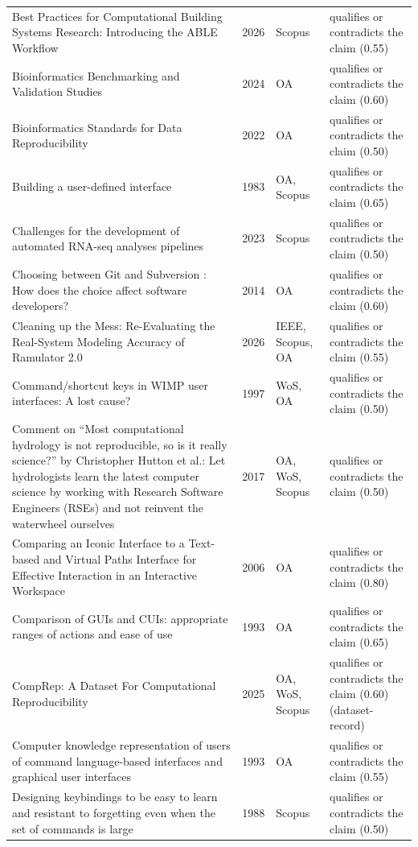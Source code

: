 \begin{longtable}{@{}%
  >{\raggedright\arraybackslash}p{}c%
  >{\raggedright\arraybackslash}p{}%
  >{\raggedright\arraybackslash}p{}@{}}
Best Practices for Computational Building Systems Research: Introducing the ABLE Workflow & 2026 & Scopus & qualifies or contradicts the claim (0.55) \\
Bioinformatics Benchmarking and Validation Studies & 2024 & OA & qualifies or contradicts the claim (0.60) \\
Bioinformatics Standards for Data Reproducibility & 2022 & OA & qualifies or contradicts the claim (0.50) \\
Building a user-defined interface & 1983 & OA, Scopus & qualifies or contradicts the claim (0.65) \\
Challenges for the development of automated RNA-seq analyses pipelines & 2023 & Scopus & qualifies or contradicts the claim (0.50) \\
Choosing between Git and Subversion : How does the choice affect software developers? & 2014 & OA & qualifies or contradicts the claim (0.60) \\
Cleaning up the Mess: Re-Evaluating the Real-System Modeling Accuracy of Ramulator 2.0 & 2026 & IEEE, Scopus, OA & qualifies or contradicts the claim (0.55) \\
Command/shortcut keys in WIMP user interfaces: A lost cause? & 1997 & WoS, OA & qualifies or contradicts the claim (0.50) \\
Comment on ``Most computational hydrology is not reproducible, so is it really science?'' by Christopher Hutton et al.: Let hydrologists learn the latest computer science by working with Research Software Engineers (RSEs) and not reinvent the waterwheel ourselves & 2017 & OA, WoS, Scopus & qualifies or contradicts the claim (0.50) \\
Comparing an Iconic Interface to a Text-based and Virtual Paths Interface for Effective Interaction in an Interactive Workspace & 2006 & OA & qualifies or contradicts the claim (0.80) \\
Comparison of GUIs and CUIs: appropriate ranges of actions and ease of use & 1993 & OA & qualifies or contradicts the claim (0.65) \\
CompRep: A Dataset For Computational Reproducibility & 2025 & OA, WoS, Scopus & qualifies or contradicts the claim (0.60) (dataset-record) \\
Computer knowledge representation of users of command language-based interfaces and graphical user interfaces & 1993 & OA & qualifies or contradicts the claim (0.55) \\
Designing keybindings to be easy to learn and resistant to forgetting even when the set of commands is large & 1988 & Scopus & qualifies or contradicts the claim (0.50) \\

\end{longtable}
